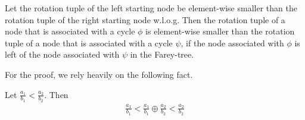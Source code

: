 \begin{theorem}
	\label{theorem:rotation.monotony}
	Let the rotation tuple of the left starting node be element-wise smaller than the rotation tuple of the right starting node w.l.o.g.
	Then the rotation tuple of a node that is associated with a cycle $\phi$ is element-wise smaller than the rotation tuple of a node that is associated with a cycle $\psi$,
	if the node associated with $\phi$ is left of the node associated with $\psi$ in the Farey-tree.
\end{theorem}

For the proof, we rely heavily on the following fact.

\begin{theorem}
	Let $\frac{a_1}{b_1} < \frac{a_2}{b_2}$. Then
	\begin{align}
		\frac{a_1}{b_1} < \frac{a_1}{b_1} \oplus \frac{a_2}{b_2} < \frac{a_2}{b_2}
	\end{align}
\end{theorem}


